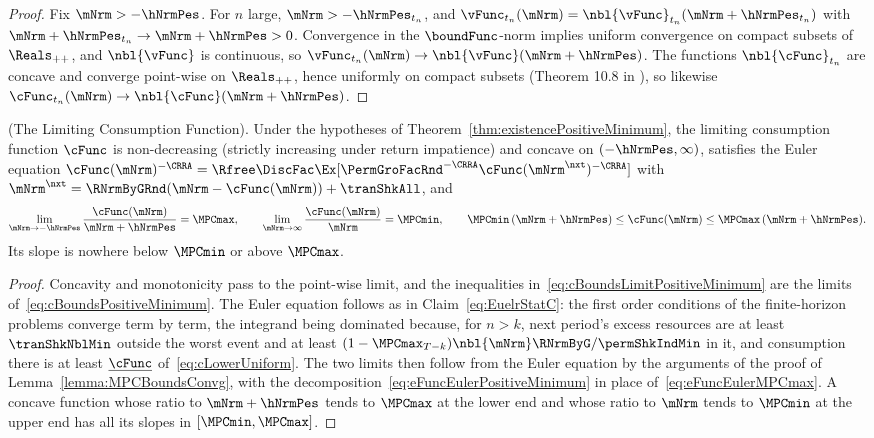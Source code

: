 \documentclass[\econtexRoot/BufferStockTheory]{subfiles}
\begin{document}
\begin{proof}
Fix $\mNrm>-\hNrmPes$.
For $n$ large, $\mNrm>-\hNrmPes_{t_{n}}$, and $\vFunc_{t_{n}}(\mNrm)=\nbl{\vFunc}_{t_{n}}(\mNrm+\hNrmPes_{t_{n}})$ with $\mNrm+\hNrmPes_{t_{n}}\rightarrow\mNrm+\hNrmPes>0$.
Convergence in the $\boundFunc$-norm implies uniform convergence on compact subsets of $\Reals_{++}$, and $\nbl{\vFunc}$ is continuous, so $\vFunc_{t_{n}}(\mNrm)\rightarrow\nbl{\vFunc}(\mNrm+\hNrmPes)$.
The functions $\nbl{\cFunc}_{t_{n}}$ are concave and converge point-wise on $\Reals_{++}$, hence uniformly on compact subsets (Theorem 10.8 in \cite{Rockafellar1972}), so likewise $\cFunc_{t_{n}}(\mNrm)\rightarrow\nbl{\cFunc}(\mNrm+\hNrmPes)$.
\end{proof}

\begin{lemma}(The Limiting Consumption Function).\label{lemma:MPCBoundsConvgPositiveMinimum}
Under the hypotheses of Theorem~\ref{thm:existencePositiveMinimum}, the limiting consumption function $\cFunc$ is non-decreasing (strictly increasing under return impatience) and concave on $(-\hNrmPes,\infty)$, satisfies the Euler equation $\cFunc(\mNrm)^{-\CRRA}=\Rfree\DiscFac\Ex[\PermGroFacRnd^{-\CRRA}\cFunc(\mNrm^{\nxt})^{-\CRRA}]$ with $\mNrm^{\nxt}=\RNrmByGRnd(\mNrm-\cFunc(\mNrm))+\tranShkAll$, and
\begin{equation}\label{eq:cBoundsLimitPositiveMinimum}
  \lim_{\mNrm\rightarrow-\hNrmPes}\frac{\cFunc(\mNrm)}{\mNrm+\hNrmPes}=\MPCmax,\qquad
  \lim_{\mNrm\rightarrow\infty}\frac{\cFunc(\mNrm)}{\mNrm}=\MPCmin,\qquad
  \MPCmin\,(\mNrm+\hNrmPes)\leq\cFunc(\mNrm)\leq\MPCmax\,(\mNrm+\hNrmPes).
\end{equation}
Its slope is nowhere below $\MPCmin$ or above $\MPCmax$.
\end{lemma}

\begin{proof}
Concavity and monotonicity pass to the point-wise limit, and the inequalities in~\eqref{eq:cBoundsLimitPositiveMinimum} are the limits of~\eqref{eq:cBoundsPositiveMinimum}.
The Euler equation follows as in Claim~\ref{eq:EuelrStatC}: the first order conditions of the finite-horizon problems converge term by term, the integrand being dominated because, for $n>k$, next period's excess resources are at least $\tranShkNblMin$ outside the worst event and at least $(1-\MPCmax_{T-k})\nbl{\mNrm}\RNrmByG/\permShkIndMin$ in it, and consumption there is at least $\underline{\cFunc}$ of~\eqref{eq:cLowerUniform}.
The two limits then follow from the Euler equation by the arguments of the proof of Lemma~\ref{lemma:MPCBoundsConvg}, with the decomposition~\eqref{eq:eFuncEulerPositiveMinimum} in place of~\eqref{eq:eFuncEulerMPCmax}.
A concave function whose ratio to $\mNrm+\hNrmPes$ tends to $\MPCmax$ at the lower end and whose ratio to $\mNrm$ tends to $\MPCmin$ at the upper end has all its slopes in $[\MPCmin,\MPCmax]$.
\end{proof}
\end{document}
